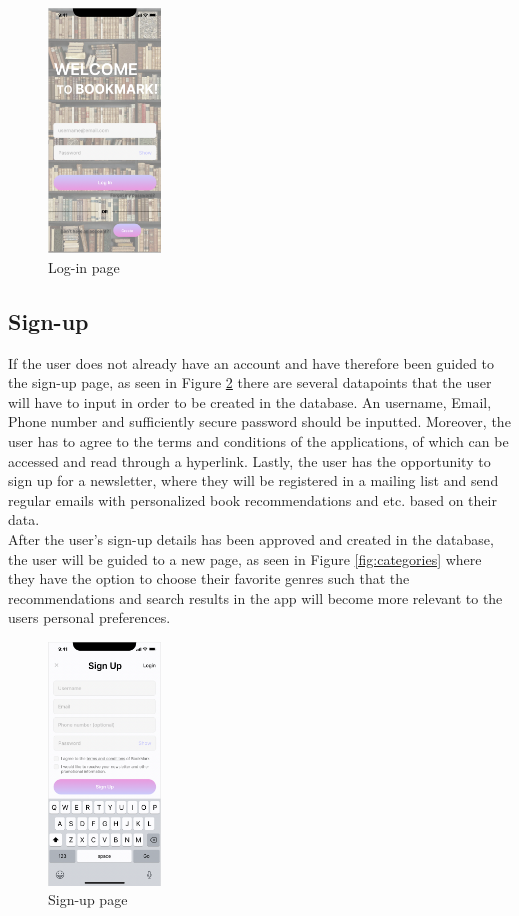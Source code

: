 \documentclass[conference]{IEEEtran}
\begin{document}
\begin{figure}[h]
    \centering
    \includegraphics[width=3cm]{Resources/Specifications/Login.png}
    \caption{Log-in page}
    \label{fig:login}
\end{figure}

\subsection{Sign-up}
If the user does not already have an account and have therefore been guided to the sign-up page, as seen in Figure \ref{fig:signup} there are several datapoints that the user will have to input in order to be created in the database. An username, Email, Phone number and sufficiently secure password should be inputted. Moreover, the user has to agree to the terms and conditions of the applications, of which can be accessed and read through a hyperlink. Lastly, the user has the opportunity to sign up for a newsletter, where they will be registered in a mailing list and send regular emails with personalized book recommendations and etc. based on their data. \\
After the user's sign-up details has been approved and created in the database, the user will be guided to a new page, as seen in Figure \ref{fig:categories} where they have the option to choose their favorite genres such that the recommendations and search results in the app will become more relevant to the users personal preferences. 


\begin{figure}[h]
    \centering
    \includegraphics[width=3cm]{Resources/Specifications/signup.png}
    \caption{Sign-up page}
    \label{fig:signup}
\end{figure}
\end{document}
